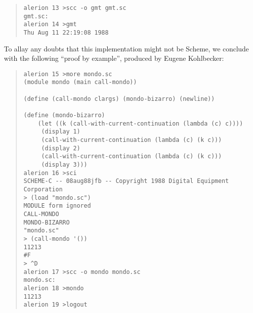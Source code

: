 \documentclass[11pt]{article}
\begin{document}
\begin{small}
\begin{quote}
\begin{verbatim}
alerion 13 >scc -o gmt gmt.sc
gmt.sc:
alerion 14 >gmt
Thu Aug 11 22:19:08 1988
\end{verbatim}
\end{quote}
\end{small}

To allay any doubts that this implementation might not be
Scheme, we conclude with the following ``proof by example'',
produced by Eugene Kohlbecker:

\begin{small}
\begin{quote}
\begin{verbatim}
alerion 15 >more mondo.sc
(module mondo (main call-mondo))

(define (call-mondo clargs) (mondo-bizarro) (newline))

(define (mondo-bizarro)
    (let ((k (call-with-current-continuation (lambda (c) c))))
	 (display 1)
	 (call-with-current-continuation (lambda (c) (k c)))
	 (display 2)
	 (call-with-current-continuation (lambda (c) (k c)))
	 (display 3)))
alerion 16 >sci
SCHEME-C -- 08aug88jfb -- Copyright 1988 Digital Equipment Corporation
> (load "mondo.sc")
MODULE form ignored
CALL-MONDO
MONDO-BIZARRO
"mondo.sc"
> (call-mondo '())
11213
#F
> ^D
alerion 17 >scc -o mondo mondo.sc
mondo.sc:
alerion 18 >mondo
11213
alerion 19 >logout
\end{verbatim}
\end{quote}
\end{small}
\end{document}

